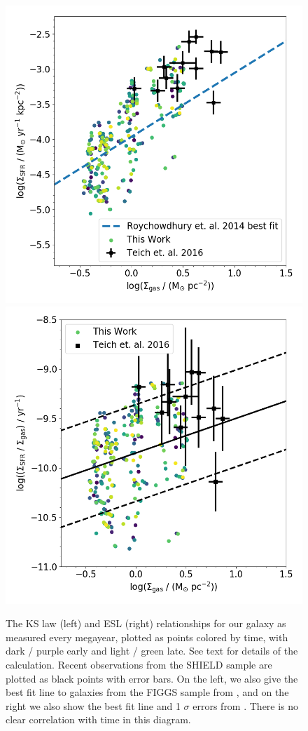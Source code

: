 \documentclass[twocolumn]{aastex61}
\begin{document}
\begin{figure}
\centering
\includegraphics[width=0.475\linewidth]{all_gas_schmidt_law_evolution}
\includegraphics[width=0.475\linewidth]{all_gass_efficiency_evolution}
\caption{The KS law (left) and ESL (right) relationships for our galaxy as measured every megayear, plotted as points colored by time, with dark / purple early and light / green late. 
    See text for details of the calculation.
Recent observations from the SHIELD sample \citep{Teich2016} are plotted as 
    black points with error bars.
On the left, we also give the best fit line to galaxies from the FIGGS sample from \cite{Roychowdhury2014}, and on the right we also show the best fit line and 1 $\sigma$ errors from \cite{Shi2011}.
   There
is no clear correlation with time in this diagram.}
\label{fig:KS}
\end{figure}
\end{document}
